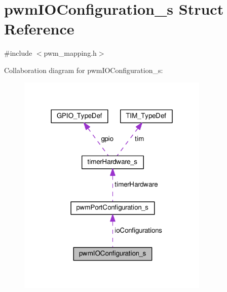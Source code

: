 \hypertarget{structpwmIOConfiguration__s}{\section{pwm\+I\+O\+Configuration\+\_\+s Struct Reference}
\label{structpwmIOConfiguration__s}
}


{\ttfamily \#include $<$pwm\+\_\+mapping.\+h$>$}



Collaboration diagram for pwm\+I\+O\+Configuration\+\_\+s\+:\nopagebreak
\begin{figure}[H]
\begin{center}
\leavevmode
\includegraphics[width=259pt]{structpwmIOConfiguration__s__coll__graph}
\end{center}
\end{figure}
